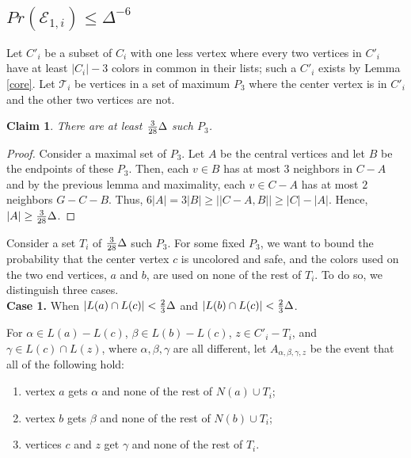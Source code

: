 \documentclass[12pt]{article}
\newtheorem{lemma}[theorem]{Lemma}
\newtheorem{claim}[theorem]{Claim}
\theoremstyle{definition}
\begin{document}
\subsection{$Pr(\mathcal{E}_{1,i})\leq \Delta^{-6}$}

Let $C'_i$ be a subset of $C_i$ with one less vertex where every two vertices in $C'_i$ have at least $|C_i|-3$ colors in common in their lists;
such a $C'_i$ exists by Lemma \ref{core}. 
%
Let $\mathcal{T}_i$ be vertices in a set of maximum $P_3$ where the center vertex is in $C'_i$ and the other two vertices are not.%

\begin{claim}
There are at least ${3\over 28}\Delta$ such $P_3$. 
\end{claim}
\begin{proof}
Consider a maximal set of $P_3$. Let $A$ be the central vertices and let $B$ be the endpoints of these $P_3$. Then, each $v\in B$ has at most $3$ neighbors in $C-A$ and by the previous lemma and maximality, each $v\in C-A$ has at most $2$ neighbors $G-C-B$. Thus, $6|A|=3|B|\geq ||C-A, B||\geq |C|-|A|$. Hence, $|A|\geq {3\over 28}\Delta$.
\end{proof}

Consider a set $T_i$ of ${3\over 28}\Delta$ such $P_3$. For some fixed $P_3$, we want to bound the probability that the center vertex $c$ is uncolored and safe, and the colors used on the two end vertices, $a$ and $b$, are used on none of the rest of $T_i$. 
To do so, we distinguish three cases. \\

{\bf Case 1.} When $|L(a)\cap L(c)|<{2\over 3}\Delta$ and $|L(b)\cap L(c)|<{2\over 3}\Delta$.

For $\alpha\in L(a)-L(c)$, $\beta\in L(b)-L(c)$, $z\in C'_i-T_i$, and $\gamma\in L(c)\cap L(z)$, where $\alpha, \beta, \gamma$ are all different, let $A_{\alpha, \beta, \gamma, z}$ be the event that all of the following hold:

\begin{enumerate}[$(i)$]
\item vertex $a$ gets $\alpha$ and none of the rest of $N(a)\cup T_i$;
\item vertex $b$ gets $\beta$ and none of the rest of $N(b)\cup T_i$;
\item vertices $c$ and $z$ get $\gamma$ and none of the rest of $T_i$.
\end{enumerate} 
\end{document}
